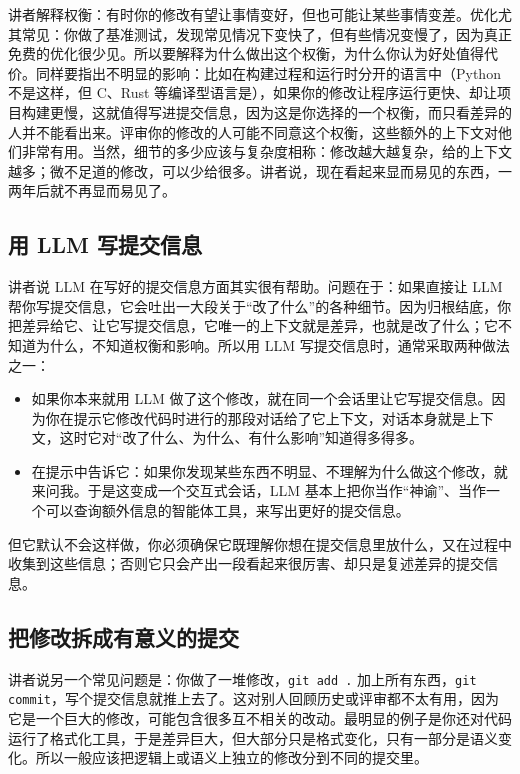 \documentclass[a4paper]{article}
\begin{document}
讲者解释权衡：有时你的修改有望让事情变好，但也可能让某些事情变差。优化尤其常见：你做了基准测试，发现常见情况下变快了，但有些情况变慢了，因为真正免费的优化很少见。所以要解释为什么做出这个权衡，为什么你认为好处值得代价。同样要指出不明显的影响：比如在构建过程和运行时分开的语言中（Python 不是这样，但 C、Rust 等编译型语言是），如果你的修改让程序运行更快、却让项目构建更慢，这就值得写进提交信息，因为这是你选择的一个权衡，而只看差异的人并不能看出来。评审你的修改的人可能不同意这个权衡，这些额外的上下文对他们非常有用。当然，细节的多少应该与复杂度相称：修改越大越复杂，给的上下文越多；微不足道的修改，可以少给很多。讲者说，现在看起来显而易见的东西，一两年后就不再显而易见了。

\subsection{用 LLM 写提交信息}

讲者说 LLM 在写好的提交信息方面其实很有帮助。问题在于：如果直接让 LLM 帮你写提交信息，它会吐出一大段关于“改了什么”的各种细节。因为归根结底，你把差异给它、让它写提交信息，它唯一的上下文就是差异，也就是改了什么；它不知道为什么，不知道权衡和影响。所以用 LLM 写提交信息时，通常采取两种做法之一：

\begin{itemize}
\item 如果你本来就用 LLM 做了这个修改，就在同一个会话里让它写提交信息。因为你在提示它修改代码时进行的那段对话给了它上下文，对话本身就是上下文，这时它对“改了什么、为什么、有什么影响”知道得多得多。
\item 在提示中告诉它：如果你发现某些东西不明显、不理解为什么做这个修改，就来问我。于是这变成一个交互式会话，LLM 基本上把你当作“神谕”、当作一个可以查询额外信息的智能体工具，来写出更好的提交信息。
\end{itemize}

但它默认不会这样做，你必须确保它既理解你想在提交信息里放什么，又在过程中收集到这些信息；否则它只会产出一段看起来很厉害、却只是复述差异的提交信息。

\subsection{把修改拆成有意义的提交}

讲者说另一个常见问题是：你做了一堆修改，\texttt{git add .} 加上所有东西，\texttt{git commit}，写个提交信息就推上去了。这对别人回顾历史或评审都不太有用，因为它是一个巨大的修改，可能包含很多互不相关的改动。最明显的例子是你还对代码运行了格式化工具，于是差异巨大，但大部分只是格式变化，只有一部分是语义变化。所以一般应该把逻辑上或语义上独立的修改分到不同的提交里。
\end{document}
